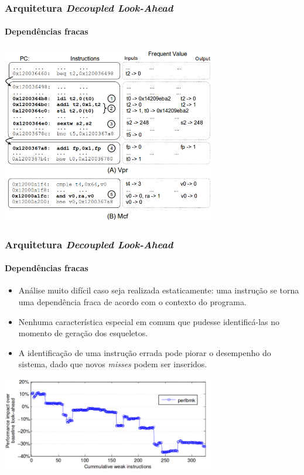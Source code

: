 \documentclass[10pt]{beamer}
\begin{document}
\begin{frame}
\frametitle{Arquitetura \textit{Decoupled Look-Ahead}}
\framesubtitle{Dependências fracas}

\centering
\includegraphics[width=0.7\textwidth]{images/example}

\end{frame}

\begin{frame}
\frametitle{Arquitetura \textit{Decoupled Look-Ahead}}
\framesubtitle{Dependências fracas}

\begin{itemize}
 \item Análise muito difícil caso seja realizada estaticamente: uma
instrução se torna uma dependência fraca de acordo com o contexto do
programa.
\item Nenhuma característica especial em comum que pudesse identificá-las no
momento de geração dos esqueletos. 

\item A identificação de uma instrução errada pode piorar o desempenho do
sistema, dado que novos \textit{misses} podem ser inseridos.
\end{itemize}

\centering
\includegraphics[width=0.7\textwidth]{images/low}

\end{frame}
\end{document}
